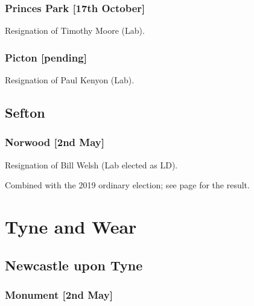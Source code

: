 \documentclass[a4paper,openany]{book}
\begin{document}
\begin{resultsiii}
\subsubsection*{Princes Park \hspace*{\fill}\nolinebreak[1]%
	\enspace\hspace*{\fill}
	[17th October]}


Resignation of Timothy Moore (Lab).

\subsubsection*{Picton \hspace*{\fill}\nolinebreak[1]%
	\enspace\hspace*{\fill}
	[pending]}


Resignation of Paul Kenyon (Lab).

\subsection*{Sefton}

\subsubsection*{Norwood \hspace*{\fill}\nolinebreak[1]%
	\enspace\hspace*{\fill}
	[2nd May]}


Resignation of Bill Welsh (Lab elected as LD).

Combined with the 2019 ordinary election; see page \pageref{SeftonNorwood} for the result.

\section{Tyne and Wear}

\subsection*{Newcastle upon Tyne}

\subsubsection*{Monument \hspace*{\fill}\nolinebreak[1]%
	\enspace\hspace*{\fill}
	[2nd May]}


\end{resultsiii}
\end{document}
